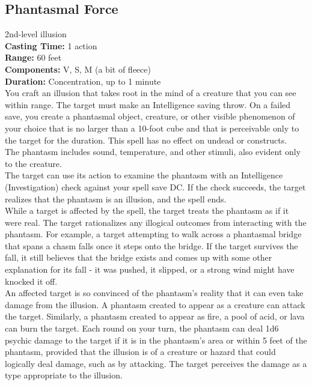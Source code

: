 \documentclass[11pt, A4paper, english]{article}
\begin{document}
		\subsection{Phantasmal Force}
2nd-level illusion \\
\textbf{Casting Time:} 1 action \\
\textbf{Range:} 60 feet \\
\textbf{Components:} V, S, M (a bit of fleece) \\
\textbf{Duration:} Concentration, up to 1 minute \\
You craft an illusion that takes root in the mind of a creature that you can see within range. The target must make an Intelligence saving throw. On a failed save, you create a phantasmal object, creature, or other visible phenomenon of your choice that is no larger than a 10-foot cube and that is perceivable only to the target for the duration. This spell has no effect on undead or constructs. \\
The phantasm includes sound, temperature, and other stimuli, also evident only to the creature. \\
The target can use its action to examine the phantasm with an Intelligence (Investigation) check against your spell save DC. If the check succeeds, the target realizes that the phantasm is an illusion, and the spell ends. \\
While a target is affected by the spell, the target treats the phantasm as if it were real. The target rationalizes any illogical outcomes from interacting with the phantasm. For example, a target attempting to walk across a phantasmal bridge that spans a chasm falls once it steps onto the bridge. If the target survives the fall, it still believes that the bridge exists and comes up with some other explanation for its fall - it was pushed, it slipped, or a strong wind might have knocked it off. \\
An affected target is so convinced of the phantasm’s reality that it can even take damage from the illusion. A phantasm created to appear as a creature can attack the target. Similarly, a phantasm created to appear as fire, a pool of acid, or lava can burn the target. Each round on your turn, the phantasm can deal 1d6 psychic damage to the target if it is in the phantasm’s area or within 5 feet of the phantasm, provided that the illusion is of a creature or hazard that could logically deal damage, such as by attacking. The target perceives the damage as a type appropriate to the illusion.
\end{document}
